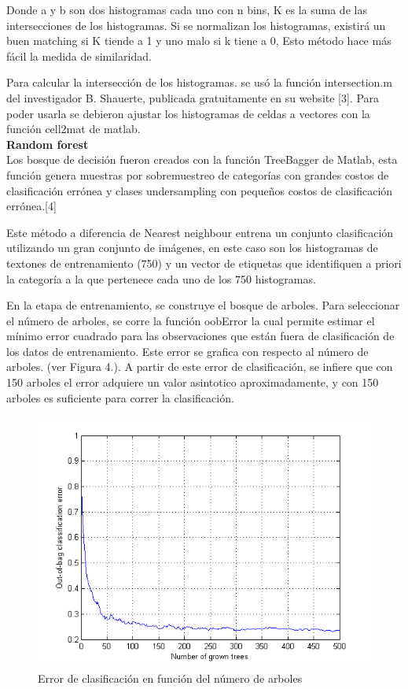 \documentclass[10pt,twocolumn,letterpaper]{article}
\begin{document}
Donde a y b son dos histogramas cada uno con n bins, K es la suma de las intersecciones de los histogramas. Si se normalizan los histogramas, existirá un buen matching si K tiende a 1 y uno malo si k tiene a 0, Esto método hace más fácil la medida de similaridad.

Para calcular la intersección de los histogramas. se usó la función intersection.m del investigador B. Shauerte, publicada gratuitamente en su website [3]. Para poder usarla se debieron ajustar los histogramas de celdas a vectores con la función cell2mat de matlab. \\

\textbf{Random forest}\\

Los bosque de decisión fueron creados con la función TreeBagger de Matlab, esta función genera muestras por sobremuestreo de categorías con grandes costos de clasificación errónea y clases undersampling con pequeños costos de clasificación errónea.[4] 

Este método a diferencia de Nearest neighbour entrena un conjunto clasificación utilizando un gran conjunto de imágenes, en este caso son los histogramas de textones de entrenamiento (750) y un vector de etiquetas que identifiquen a priori la categoría a la que pertenece cada uno de los 750 histogramas.

En la etapa de entrenamiento, se construye el bosque de arboles. Para seleccionar el número de arboles, se corre la función oobError la cual permite estimar el mínimo error cuadrado para las observaciones que están fuera de clasificación de los datos de entrenamiento. Este error se grafica con respecto al número de arboles. (ver Figura 4.). A partir de este error de clasificación, se infiere que con 150 arboles el error adquiere un valor asintotico aproximadamente, y con 150 arboles es suficiente para correr la clasificación. 


\begin{figure}[h]
   \includegraphics[width=1\linewidth]{Errores_TreeForest.png}
   \caption{Error de clasificación en función del número de arboles}
\end{figure}
\end{document}
